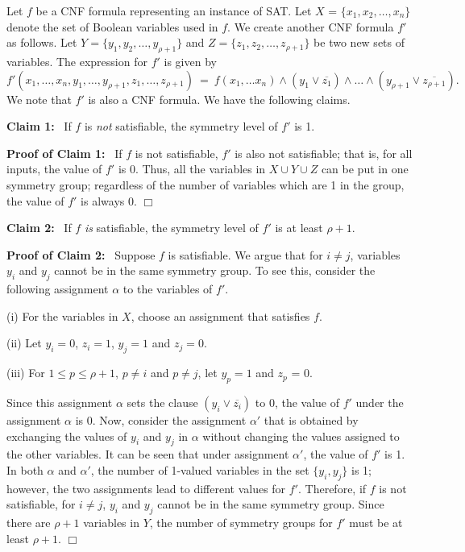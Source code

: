 Let $f$ be a CNF formula representing an instance of SAT.
Let $X$ = $\{x_1, x_2, \ldots, x_n\}$ denote the set of
Boolean variables used in $f$.
We create another CNF formula $f'$ as follows.
Let $Y = \{y_1, y_2, \ldots, y_{\rho+1}\}$ and
$Z = \{z_1, z_2, \ldots, z_{\rho+1}\}$ be two new sets of variables.
The expression for $f'$ is given by
\[
f'(x_1, \ldots, x_n, y_1, \ldots, y_{\rho+1},
z_1, \ldots, z_{\rho+1}) ~=~ 
    f(x_1, \ldots x_n) \wedge (y_1 \vee \overline{z_1}) \wedge \ldots \wedge
                              (y_{\rho+1} \vee \overline{z_{\rho+1}}).
\]
We note that $f'$ is also a CNF formula.
We have the following claims.

\medskip

\noindent
\textbf{Claim 1:}~ If $f$ is \emph{not} satisfiable, 
the symmetry level of $f'$ is 1.

\smallskip

\noindent
\textbf{Proof of Claim 1:}~ If $f$ is not satisfiable, $f'$ is also
not satisfiable; that is, for all inputs, the value of $f'$ is 0.
Thus, all the variables in $X \cup Y \cup Z$ can be put in one
symmetry group; regardless of the number of variables 
which are 1 in the group, the value of $f'$ is always 0. 
\hfill$\Box$

\medskip

\noindent
\textbf{Claim 2:}~ If $f$ \emph{is} satisfiable, 
the symmetry level of $f'$ is at least $\rho+1$.

\smallskip

\noindent
\textbf{Proof of Claim 2:}~ Suppose $f$ is satisfiable.
We argue that for $i \neq j$, variables $y_i$ and $y_j$
cannot be in the same symmetry group.
To see this, consider the following assignment $\alpha$ to
the variables of $f'$.
\begin{description}
\item{(i)} For the variables in $X$, choose an assignment that
satisfies $f$.
\item{(ii)} Let $y_i = 0$, $z_i = 1$, $y_j = 1$ and $z_j = 0$.
\item{(iii)} For $1 \leq p \leq \rho+1$, $p \neq i$ and $p \neq j$,
let $y_p = 1$ and $z_p$ = 0.
\end{description}
Since this assignment $\alpha$ sets the clause $(y_i \vee \overline{z_i})$ to 0,
the value of $f'$ under the assignment $\alpha$ is 0.
Now, consider the assignment $\alpha'$ that is obtained by exchanging
the values of $y_i$ and $y_j$ in $\alpha$ without changing the
values assigned to the other variables. 
It can be seen that under assignment $\alpha'$, the value of $f'$ is 1.
In both $\alpha$ and $\alpha'$, the number of 1-valued variables in 
the set $\{y_i, y_j\}$ is 1; however, the two assignments lead to 
different values for $f'$.
Therefore, if $f$ is not satisfiable, for $i \neq j$, $y_i$ and $y_j$ cannot
be in the same symmetry group.
Since there are $\rho+1$ variables in $Y$, the number of symmetry groups 
for $f'$ must be at least $\rho+1$. \hfill$\Box$

